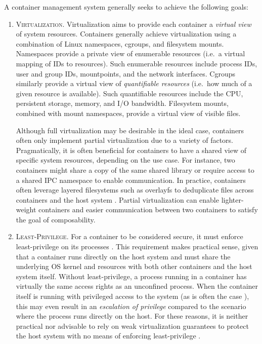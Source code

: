 A container management system generally seeks to achieve the following goals:
\begin{enumerate}[label=\bfseries CG\arabic*., ref=CG\arabic*, labelindent=1em]
  \item \textsc{Virtualization.}
    Virtualization aims to provide each container a \textit{virtual view} of system resources.  Containers generally achieve virtualization using a combination of Linux namespaces, cgroups, and filesystem mounts. Namespaces provide a private view of enumerable resources (i.e.~a virtual mapping of IDs to resources). Such enumerable resources include process IDs, user and group IDs, mountpoints, and the network interfaces. Cgroups similarly provide a virtual view of \textit{quantifiable resources} (i.e.~how much of a given resource is available). Such quantifiable resources include the CPU, persistent storage, memory, and I/O bandwidth. Filesystem mounts, combined with mount namespaces, provide a virtual view of visible files.

    Although full virtualization may be desirable in the ideal case, containers often only implement partial virtualization  due to a variety of factors. Pragmatically, it is often beneficial for containers to have a shared view of specific system resources, depending on the use case. For instance, two containers might share a copy of the same shared library or require access to a shared IPC namespace to enable communication. In practice, containers often leverage layered filesystems such as overlayfs \cite{edge2010_overlayfs} to deduplicate files across containers and the host system . Partial virtualization can enable lighter-weight containers and easier communication between two containers to satisfy the goal of composability.

  \item \textsc{Least-Privilege.}
    For a container to be considered secure, it must enforce least-privilege on its processes \cite{sultan2019_container_security}. This requirement makes practical sense, given that a container runs directly on the host system and must share the underlying OS kernel and resources with both other containers and the host system itself. Without least-privilege, a process running in a container has virtually the same access rights as an unconfined process. When the container itself is running with privileged access to the system (as is often the case ), this may even result in an \textit{escalation of privilege} compared to the scenario where the process runs directly on the host. For these reasons, it is neither practical nor advisable to rely on weak virtualization guarantees to protect the host system with no means of enforcing least-privilege \cite{sultan2019_container_security}.


\end{enumerate}
